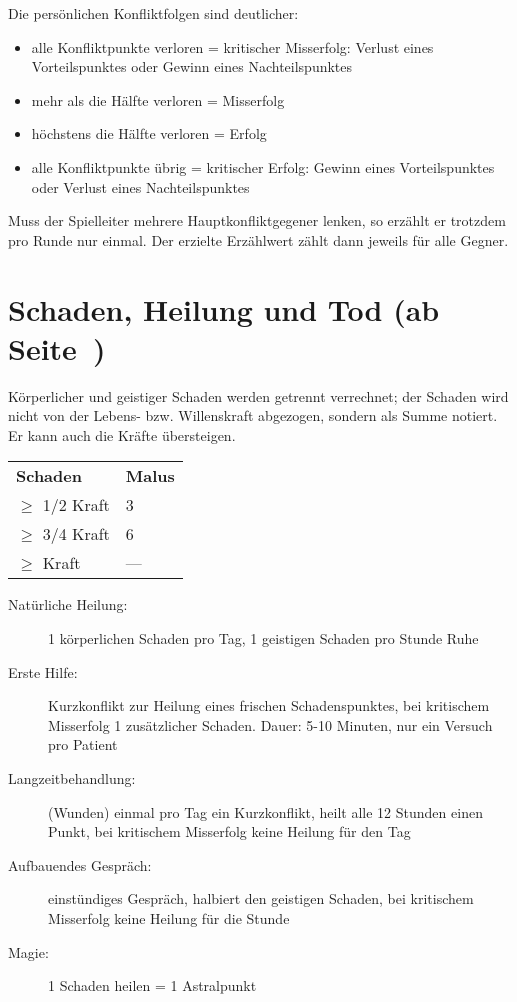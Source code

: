 Die persönlichen Konfliktfolgen sind deutlicher:
\begin{itemize}
\item alle Konfliktpunkte verloren = kritischer Misserfolg: Verlust eines Vorteilspunktes oder Gewinn eines Nachteilspunktes
\item mehr als die Hälfte verloren = Misserfolg
\item höchstens die Hälfte verloren = Erfolg
\item alle Konfliktpunkte übrig = kritischer Erfolg: Gewinn eines Vorteilspunktes oder Verlust eines Nachteilspunktes
\end{itemize}

Muss der Spielleiter mehrere Hauptkonfliktgegener lenken, so erzählt er trotzdem pro Runde nur einmal. Der erzielte Erzählwert zählt dann jeweils für alle Gegner.

\section[Schaden, Heilung und Tod]{Schaden, Heilung und Tod (ab Seite~\pageref{Ch:SchadenHeilungUndTod})}

Körperlicher und geistiger Schaden werden getrennt verrechnet; der Schaden wird nicht von der Lebens- bzw. Willenskraft abgezogen, sondern als Summe notiert. Er kann auch die Kräfte übersteigen.
\begin{tabular}[C]{ll}
	\bf Schaden \boldmath  & \bf Malus \\
	$\ge$ 1/2 Kraft & 3 \\
	$\ge$ 3/4 Kraft & 6 \\
	$\ge$ Kraft  & --- \\
\end{tabular}

\begin{description}
\item[Natürliche Heilung:] 1 körperlichen Schaden pro Tag, 1 geistigen Schaden pro Stunde Ruhe
\item[Erste Hilfe:] Kurzkonflikt zur Heilung eines frischen Schadenspunktes, bei kritischem Misserfolg 1 zusätzlicher Schaden. Dauer: 5-10 Minuten, nur ein Versuch pro Patient
\item[Langzeitbehandlung:] (Wunden) einmal pro Tag ein Kurzkonflikt, heilt alle 12 Stunden einen Punkt, bei kritischem Misserfolg keine Heilung für den Tag
\item[Aufbauendes Gespräch:] einstündiges Gespräch, halbiert den geistigen Schaden, bei kritischem Misserfolg keine Heilung für die Stunde
\item[Magie:] 1 Schaden heilen =  1 Astralpunkt
\end{description}

